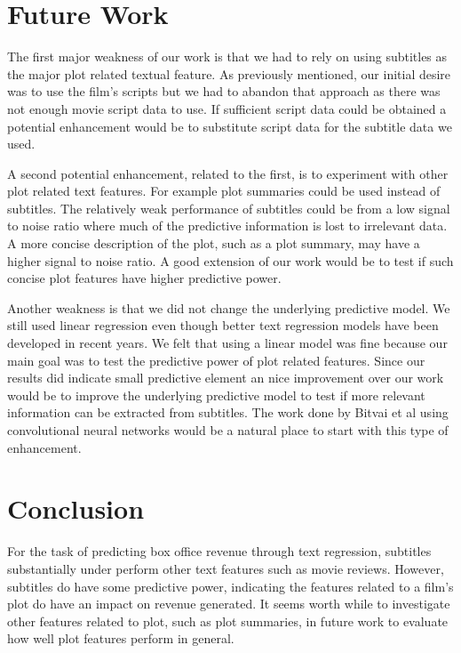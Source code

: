 \documentclass[11pt]{article}
\begin{document}
\section{Future Work}
The first major weakness of our work is that we had to rely on using subtitles as the
major plot related textual feature. As previously mentioned, our initial desire was to
use the film's scripts but we had to abandon that approach as there was not enough
movie script data to use. If sufficient script data could be obtained a potential
enhancement would be to substitute script data for the subtitle data we used.

A second potential enhancement, related to the first, is to experiment with other
plot related text features. For example plot summaries could be used instead of subtitles.
The relatively weak performance of subtitles could be from a low signal to noise ratio
where much of the predictive information is lost to irrelevant data. A more concise
description of the plot, such as a plot summary, may have a higher signal to noise ratio.
A good extension of our work would be to test if such concise plot features have higher
predictive power.

Another weakness is that we did not change the underlying predictive model. We still
used linear regression even though better text regression models have been developed in
recent years. We felt that using a linear model was fine because our main goal was to
test the predictive power of plot related features. Since our results did indicate small
predictive element an nice improvement over our work would be to improve the underlying
predictive model to test if more relevant information can be extracted from subtitles.
The work done by Bitvai et al using convolutional neural networks would be a natural place
to start with this type of enhancement. 

\section{Conclusion}
For the task of predicting box office revenue through text regression, subtitles
substantially under perform other text features such as movie reviews. However,
subtitles do have some predictive power, indicating the features related to a film's plot
do have an impact on revenue generated. It seems worth while to investigate other
features related to plot, such as plot summaries, in future work to evaluate how well
plot features perform in general.
\end{document}
